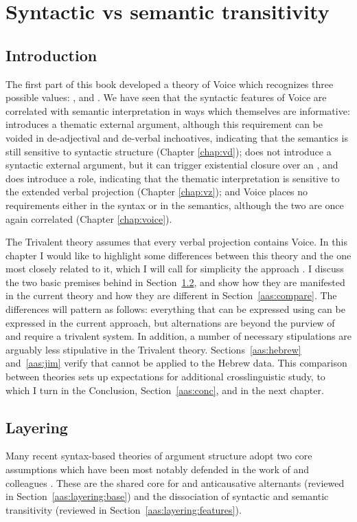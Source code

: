 \chapter{Syntactic vs semantic transitivity}
\label{chap:aas}

\section{Introduction} \label{sec:intro}
The first part of this book developed a theory of Voice which recognizes three possible values: {\vd}, {\vz} and . We have seen that the syntactic features of Voice are correlated with semantic interpretation in ways which themselves are informative: {\vd} introduces a thematic external argument, although this requirement can be voided in de-adjectival and de-verbal inchoatives, indicating that the semantics is still sensitive to syntactic structure (Chapter \ref{chap:vd}); {\vz} does not introduce a syntactic external argument, but it can trigger existential closure over an , and {\pz} does introduce a  role, indicating that the thematic interpretation is sensitive to the extended verbal projection (Chapter \ref{chap:vz}); and Voice places no requirements either in the syntax or in the semantics, although the two are once again correlated (Chapter \ref{chap:voice}).

The Trivalent theory assumes that every verbal projection contains Voice. In this chapter I would like to highlight some differences between this theory and the one most closely related to it, which I will call for simplicity the \textbf{} approach \citep{schaefer08,layering15}. I discuss the two basic premises behind  in Section~\ref{aas:layering}, and show how they are manifested in the current theory and how they are different in Section~\ref{aas:compare}. The differences will pattern as follows: everything that can be expressed using  can be expressed in the current approach, but  alternations are beyond the purview of  and require a trivalent system. In addition, a number of necessary stipulations are arguably less stipulative in the Trivalent theory. Sections~\ref{aas:hebrew} and~\ref{aas:jim} verify that  cannot be applied to the Hebrew data. This comparison between theories sets up expectations for additional crosslinguistic study, to which I turn in the Conclusion, Section~\ref{aas:conc}, and in the next chapter.


\section{Layering} \label{aas:layering}
Many recent syntax-based theories of argument structure adopt two core assumptions which have been most notably defended in the work of \cite{schaefer08} and colleagues \citep{alexiadouetal06,layering15}. These are the shared core for  and anticausative alternants (reviewed in Section~\ref{aas:layering:base}) and the dissociation of syntactic and semantic transitivity (reviewed in Section~\ref{aas:layering:features}).

